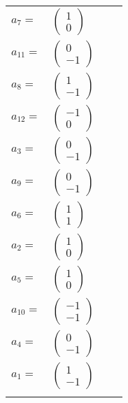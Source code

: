 \documentclass[1p]{elsarticle_modified}
\theoremstyle{definition}
\begin{document}
\begin{tabular}{m{7pt} m{180pt} m{7pt} m{180pt} }
\flushright $a_{7}=$&$\begin{pmatrix}1\\0\end{pmatrix}$ \\
\flushright $a_{11}=$&$\begin{pmatrix}0\\-1\end{pmatrix}$ \\
\flushright $a_{8}=$&$\begin{pmatrix}1\\-1\end{pmatrix}$ \\
\flushright $a_{12}=$&$\begin{pmatrix}-1\\0\end{pmatrix}$ \\
\flushright $a_{3}=$&$\begin{pmatrix}0\\-1\end{pmatrix}$ \\
\flushright $a_{9}=$&$\begin{pmatrix}0\\-1\end{pmatrix}$ \\
\flushright $a_{6}=$&$\begin{pmatrix}1\\1\end{pmatrix}$ \\
\flushright $a_{2}=$&$\begin{pmatrix}1\\0\end{pmatrix}$ \\
\flushright $a_{5}=$&$\begin{pmatrix}1\\0\end{pmatrix}$ \\
\flushright $a_{10}=$&$\begin{pmatrix}-1\\-1\end{pmatrix}$ \\
\flushright $a_{4}=$&$\begin{pmatrix}0\\-1\end{pmatrix}$ \\
\flushright $a_{1}=$&$\begin{pmatrix}1\\-1\end{pmatrix}$\\&\end{tabular}
\end{document}
